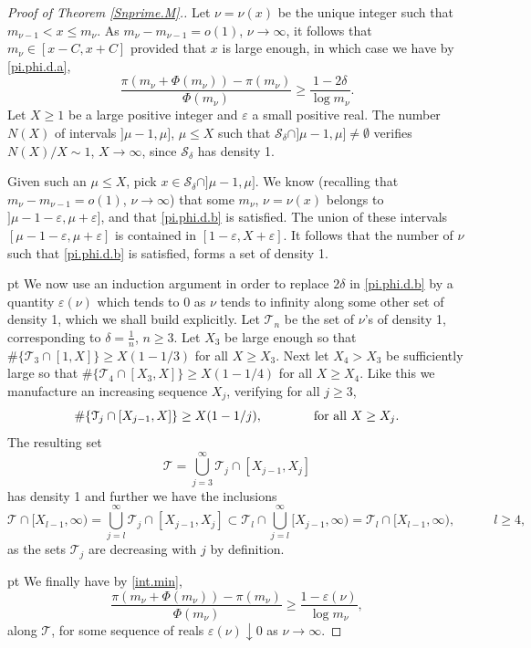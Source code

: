 \documentclass[11pt,draft,reqno]{amsart}
\theoremstyle{definition}
\theoremstyle{remarks}
\numberwithin{equation}{section}
\def \d{{\delta}}
\def \e{{\varepsilon}}
\def \m{{\mu}}
\def \qq{{\qquad}}
\begin{document}
\begin{proof}[Proof of Theorem \ref{Snprime.M}.]
\vskip 3pt   
Let $\nu=\nu(x)$ be the  unique integer   such that $m_{\nu-1}< x\le m_{\nu}$. As $m_{\nu}-m_{\nu-1}=o(1)$,  $\nu \to \infty$,  it follows that $m_{\nu}\in [x-C,x+C]$ provided that   $x$ is large enough, in which case we have by   \eqref{pi.phi.d.a},
  \begin{equation}\label{pi.phi.d.b}
 \frac{\pi(m_{\nu}+\Phi(m_{\nu}))-\pi(m_{\nu})}{\Phi(m_{\nu})}  \ge  \frac{1-2\d}{\log m_{\nu}}.
 \end{equation} 
   Let $X\ge 1$ be a large positive integer and $\e$  a small positive real. The number $N(X)$ of intervals $]\m-1,\m]$, $\m\le X$ such that $\mathcal S_\d \cap ]\m-1,\m]\neq \emptyset$ verifies $N(X)/X\sim 1$, $X\to \infty$, since $\mathcal S_\d$ has density 1. 
 
 Given such an $\m\le X$, pick $x\in \mathcal S_\d \cap ]\m-1,\m]$. 
 We know (recalling that $m_{\nu}-m_{\nu-1}=o(1)$,  $\nu \to \infty$) that some $m_{\nu}$, $\nu=\nu(x)$ belongs to   $ ]\m-1-\e,\m+\e]$, and that \eqref{pi.phi.d.b} is satisfied.   The union of these intervals $[\m-1-\e,\m+\e ]$ is contained in $[1-\e , X+\e ]$. It follows that the number of $\nu$ such that \eqref{pi.phi.d.b} is satisfied, forms a set of density 1. 
  
  pt  We now use an induction argument in order to replace $2\d$ in  \eqref{pi.phi.d.b} by a quantity $\e(\nu)$ which  tends to 0 as $\nu$ tends to infinity  along some other set of density 1, which we shall build explicitly.    Let $\mathcal T_n$ be the set   of $\nu$'s of density 1, corresponding to $\d=\frac1n$, $n\ge 3$. Let $X_3$ be large enough so   that $\#\{\mathcal T_3\cap [1, X ]\}\ge X (1-1/3)$ for all $X\ge X_3$. Next let  $X_4>X_3$ be sufficiently large  so   that $\#\{\mathcal T_4\cap [X_3, X ]\}\ge X (1-1/4)$ for all $X\ge X_4$. Like this we manufacture an increasing sequence $X_j$,   verifying for all $j\ge 3$,
  $$\#\{\mathcal T_j\cap [X_{j-1}, X ]\}\ge X (1-1/j), \qq \qq {\rm for\ all}\  X\ge X_j .$$
  The resulting set 
  $$ \mathcal T= \bigcup_{j=3}^\infty \mathcal T_j\cap [X_{j-1}, X_j ]$$
  has density 1 and further we have the inclusions 
  $$\mathcal T\cap [X_{l-1}, \infty )=\bigcup_{j=l}^\infty \mathcal T_j\cap [X_{j-1}, X_j ]\subset \mathcal T_l\cap\bigcup_{j=l}^\infty   [X_{j-1}, \infty )=\mathcal T_l\cap [X_{l-1},\infty),\qq\quad l\ge 4,$$
as   the sets $\mathcal T_j$ are decreasing with $j$ by definition.   

 pt We finally have  by \eqref{int.min},
  \begin{equation}\label{pi.phi.d.b.1}
 \frac{\pi(m_{\nu}+\Phi(m_{\nu}))-\pi(m_{\nu})}{\Phi(m_{\nu})}  \ge  \frac{1-\e(\nu)}{\log m_{\nu}},
 \end{equation}
along $\mathcal T$, for some sequence of reals $\e(\nu)\downarrow 0$ as $\nu\to \infty$.
 

\end{proof}
\end{document}
